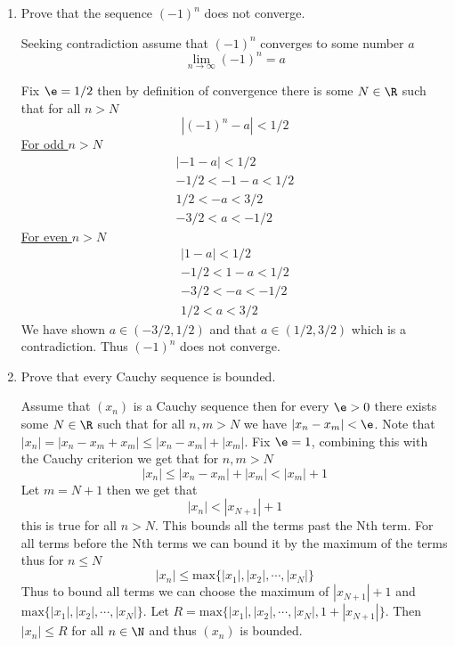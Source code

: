 \documentclass[11pt]{exam}
\begin{document}
    \begin{enumerate}
        \item Prove that the sequence $(-1)^n$ does not converge.
            \begin{solution}
                Seeking contradiction assume that $(-1)^n$ converges to some number $a$ $$\lim_{n \to \infty} (-1)^n = a$$

                Fix $\e = 1/2$ then by definition of convergence there is some $N \in \R$ such that for all $n  > N$  $$\left|(-1)^n - a\right| < 1/2$$
                \underline{For odd $n > N$}
                \begin{align*}
                    \left|-1 - a\right| < 1/2 \\
                    -1/2 < -1 - a < 1/2 \\
                    1/2 < -a < 3/2 \\
                    -3/2 < a < -1/2
                \end{align*}
                \underline{For even $n > N$}
                \begin{align*}
                    \left|1 - a\right| < 1/2 \\
                    -1/2 < 1 - a < 1/2 \\
                    -3/2 < -a < -1/2 \\
                    1/2 < a < 3/2
                \end{align*}
            We have shown $a \in (-3/2, 1/2)$ and that $a \in (1/2, 3/2)$ which is a contradiction. Thus $(-1)^n$ does not converge.
            \end{solution}
        \item Prove that every Cauchy sequence is bounded.
            \begin{solution}
                Assume that $(x_n)$ is a Cauchy sequence then for every $\e > 0$ there exists some $N \in \R$ such that for all $n, m > N$ we have $|x_n - x_m| < \e$. Note that $|x_n| = |x_n - x_m + x_m| \leq |x_n - x_m| + |x_m|$. Fix $\e = 1$, combining this with the Cauchy criterion we get that for $n, m > N$
                $$|x_n| \leq |x_n - x_m| + |x_m| < |x_m| + 1$$
                Let $m = N + 1$ then we get that 
                $$|x_n| < |x_{N+1}| + 1$$
                this is true for all $n > N$. This bounds all the terms past the Nth term. For all terms before the Nth terms we can bound it by the maximum of the terms thus for $n \leq N$
                $$ |x_n| \leq \text{max}\{|x_1|, |x_2|, \cdots , |x_N|\}$$
                Thus to bound all terms we can choose the maximum of $|x_{N+1}| + 1$ and $\text{max}\{|x_1|, |x_2|, \cdots , |x_N|\}$. Let $R = \text{max}\{|x_1|, |x_2|, \cdots , |x_N|, 1 + |x_{N+1}|\}$. Then $|x_n| \leq R$ for all $n \in \N$ and thus $(x_n)$ is bounded. 

\end{solution}
\end{enumerate}
\end{document}
